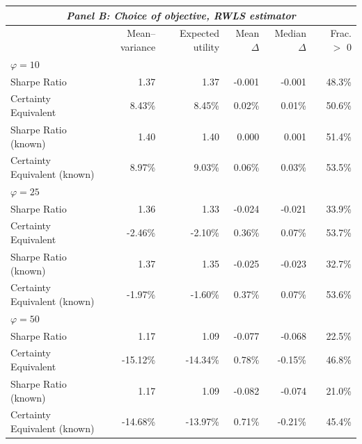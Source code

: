 \begin{tabular*}{\textwidth}{l@{\extracolsep{\fill}}rrrrr}
\multicolumn{6}{c}{\textit{Panel B: Choice of objective, RWLS estimator}} \\
\midrule
 & Mean--variance & Expected utility & Mean $\Delta$ & Median $\Delta$ & Frac. $>$ 0 \\
\midrule
\multicolumn{6}{l}{\textit{$\varphi = 10$}} \\
\midrule
Sharpe Ratio & 1.37 & 1.37 & -0.001 & -0.001 & 48.3\% \\
Certainty Equivalent & 8.43\% & 8.45\% & 0.02\% & 0.01\% & 50.6\% \\
Sharpe Ratio (known) & 1.40 & 1.40 & 0.000 & 0.001 & 51.4\% \\
Certainty Equivalent (known) & 8.97\% & 9.03\% & 0.06\% & 0.03\% & 53.5\% \\
\midrule
\multicolumn{6}{l}{\textit{$\varphi = 25$}} \\
\midrule
Sharpe Ratio & 1.36 & 1.33 & -0.024 & -0.021 & 33.9\% \\
Certainty Equivalent & -2.46\% & -2.10\% & 0.36\% & 0.07\% & 53.7\% \\
Sharpe Ratio (known) & 1.37 & 1.35 & -0.025 & -0.023 & 32.7\% \\
Certainty Equivalent (known) & -1.97\% & -1.60\% & 0.37\% & 0.07\% & 53.6\% \\
\midrule
\multicolumn{6}{l}{\textit{$\varphi = 50$}} \\
\midrule
Sharpe Ratio & 1.17 & 1.09 & -0.077 & -0.068 & 22.5\% \\
Certainty Equivalent & -15.12\% & -14.34\% & 0.78\% & -0.15\% & 46.8\% \\
Sharpe Ratio (known) & 1.17 & 1.09 & -0.082 & -0.074 & 21.0\% \\
Certainty Equivalent (known) & -14.68\% & -13.97\% & 0.71\% & -0.21\% & 45.4\% \\
\bottomrule
\end{tabular*}

